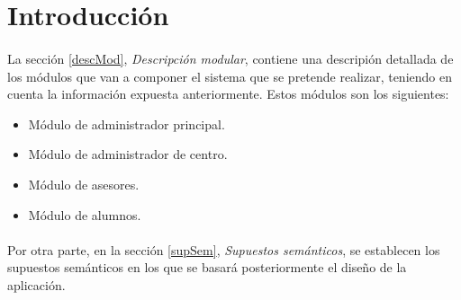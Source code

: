 \section{Introducción}

\paragraph{}La sección \ref{descMod}, \textit{Descripción modular}, contiene
una descripión detallada de los módulos que van a componer el sistema que se
pretende realizar, teniendo en cuenta la información expuesta anteriormente.
Estos módulos son los siguientes:
\begin{itemize}
   \item Módulo de administrador principal.
   \item Módulo de administrador de centro.
   \item Módulo de asesores.
   \item Módulo de alumnos.
\end{itemize}

\paragraph{}Por otra parte, en la sección \ref{supSem},
\textit{Supuestos semánticos}, se establecen los supuestos semánticos en los
que se basará posteriormente el diseño de la aplicación.
